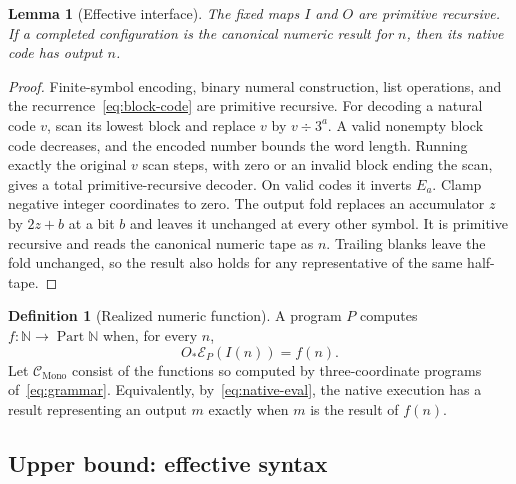 \documentclass[11pt]{article}
\numberwithin{equation}{section}
\newtheorem{lemma}[theorem]{Lemma}
\theoremstyle{definition}
\newtheorem{definition}[theorem]{Definition}
\theoremstyle{remark}
\newcommand{\N}{\mathbb N}
\newcommand{\Part}{\operatorname{Part}}
\begin{document}
\begin{lemma}[Effective interface]\label{lem:io}
The fixed maps $I$ and $O$ are primitive recursive. If a completed
configuration is the canonical numeric result for $n$, then its native
code has output $n$.
\end{lemma}
\begin{proof}
Finite-symbol encoding, binary numeral construction, list operations,
and the recurrence~\eqref{eq:block-code} are primitive recursive.
For decoding a natural code $v$, scan its lowest block and replace
$v$ by $v\div3^a$. A valid nonempty block code decreases, and the
encoded number bounds the word length. Running exactly the original
$v$ scan steps, with zero or an invalid block ending the scan, gives
a total primitive-recursive decoder. On valid codes it inverts $E_a$.
Clamp negative integer coordinates to zero. The output fold replaces
an accumulator $z$ by $2z+b$ at a bit $b$ and leaves it unchanged at
every other symbol. It is primitive recursive and reads the canonical
numeric tape as $n$. Trailing blanks leave the fold unchanged, so
the result also holds for any representative of the same half-tape.
\end{proof}

\begin{definition}[Realized numeric function]\label{def:realizable}
A program $P$ computes $f:\N\to\Part\N$ when, for every $n$,
\begin{equation}\label{eq:computes}
 O_*\mathcal E_P(I(n))=f(n).
\end{equation}
Let $\mathcal C_{\mathrm{Mono}}$ consist of the functions so computed
by three-coordinate programs of~\eqref{eq:grammar}. Equivalently,
by~\eqref{eq:native-eval}, the native execution has a result representing
an output $m$ exactly when $m$ is the result of $f(n)$.
\end{definition}

\subsection{Upper bound: effective syntax}
\end{document}
